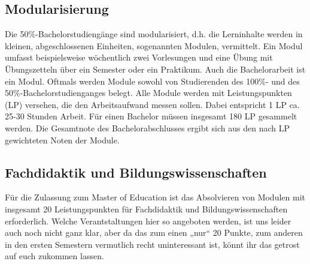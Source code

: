 \subsection{Modularisierung}

Die 50\%-Bachelorstudiengänge sind modularisiert, d.h. die Lerninhalte werden in kleinen, abgeschlossenen Einheiten, sogenannten Modulen, vermittelt. Ein Modul umfasst beispielsweise wöchentlich zwei Vorlesungen und eine Übung mit Übungszetteln über ein Semester oder ein Praktikum. Auch die Bachelorarbeit ist ein Modul. Oftmals werden Module sowohl von Studierenden des 100\%- und des 50\%-Bachelorstudienganges belegt. Alle Module werden mit Leistungspunkten (\gls{LP}) versehen, die den Arbeitsaufwand messen sollen. Dabei entspricht 1 \gls{LP} ca. 25-30 Stunden Arbeit. Für einen Bachelor müssen insgesamt 180 \gls{LP} gesammelt werden. Die Gesamtnote des Bachelorabschlusses ergibt sich aus den nach \gls{LP} gewichteten Noten der Module.

\subsection{Fachdidaktik und Bildungswissenschaften}

Für die Zulassung zum Master of Education ist das Absolvieren von Modulen mit insgesamt 20 Leistungspunkten für Fachdidaktik und Bildungswissenschaften erforderlich. Welche Verantstaltungen hier so angeboten werden, ist uns leider auch noch nicht ganz klar, aber da das zum einen „nur“ 20 Punkte, zum anderen in den ersten Semestern vermutlich recht uninteressant ist, könnt ihr das getrost auf euch zukommen lassen.


